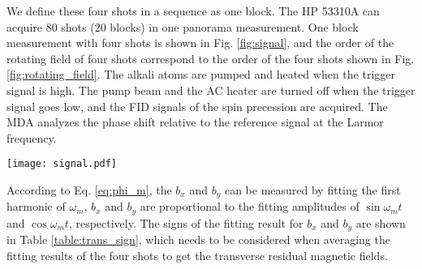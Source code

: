 \documentclass[prx,twocolumn,10pt,nofootinbib]{revtex4-1}
\begin{document}
 We define these four shots in a sequence as one block. The HP 53310A can acquire 80 shots (20 blocks) in one panorama measurement. One block measurement with four shots is shown in Fig. \ref{fig:signal}, and the order of the rotating field of four shots correspond to the order of the four shots shown in Fig. \ref{fig:rotating_field}. The alkali atoms are pumped and heated when the trigger signal is high. The pump beam and the AC heater are turned off when the trigger signal goes low, and the FID signals of the spin precession are acquired. The MDA analyzes the phase shift relative to the reference signal at the Larmor frequency.
 \begin{figure*}[!hbt]
 \centering
    \texttt{[image: signal.pdf]}
    \caption{There are four shots of different start phases of $B_x$ and $B_y$ at the beginning of each measurement time. This four-shot scheme is specifically developed to cancel out the systematic effects, such as Berry’s phase shift, dynamic heading error, probe beam heading error, eddy current, and the systematic caused by the threshold voltage of the MDA. The magnetic field only flips during the peak values to suppress the eddy current caused by the rotating field (``cosine switch''). The quadrant photodiode acquires the precession signals, the signals are deferentially amplified by a low-noise amplifier (Thorlabs SR560), and the signals during the preparation time are blanked out. A first-order high-pass filter further filters the signals with a cutoff frequency of 150 kHz before entering the MDA.}
    \label{fig:signal}
 \end{figure*}

 According to Eq. \ref{eq:phi_m}, the $b_x$ and $b_y$ can be measured by fitting the first harmonic of $\omega_m$, $b_x$ and $b_y$ are proportional to the fitting amplitudes of $\sin \omega_m t$ and $\cos \omega_m t$, respectively. The signs of the fitting result for $b_x$ and $b_y$ are shown in Table \ref{table:trans_sign}, which needs to be considered when averaging the fitting results of the four shots to get the transverse residual magnetic fields. 
\end{document}
